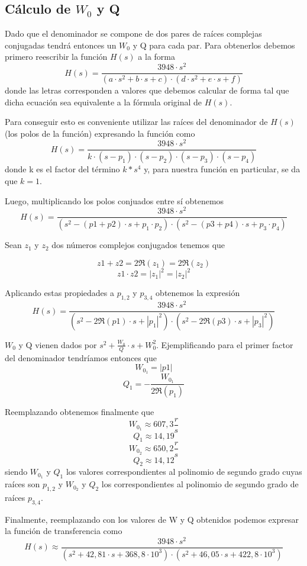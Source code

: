 \documentclass[11pt,a4paper]{report}
\begin{document}
\subsection*{Cálculo de $W_{0}$ y Q}

Dado que el denominador se compone de dos pares de raíces complejas conjugadas tendrá entonces un $W_{0}$ y Q para cada par. Para obtenerlos debemos primero reescribir la función $H(s)$ a la forma
\[H(s)=\frac{3948 \cdot s^2}{(a \cdot s^2+b \cdot s+c) \cdot (d \cdot s^2+e \cdot s+f)}\]
donde las letras corresponden a valores que debemos calcular de forma tal que dicha
ecuación sea equivalente a la fórmula original de $H(s)$.

\bigskip
Para conseguir esto es conveniente utilizar las raíces del denominador de $H(s)$ (los polos de la función) expresando la función como
\[H(s)=\frac{3948 \cdot s^2}{k \cdot (s-p_{1}) \cdot (s-p_{2}) \cdot (s-p_{3}) \cdot (s-p_{4})}\]
donde k es el factor del término $k*s^4$ y, para nuestra función en particular,
se da que $k=1$. 

\bigskip
Luego, multiplicando los polos conjuados entre sí obtenemos
\[H(s)=\frac{3948 \cdot s^2}{(s^2-(p1+p2) \cdot s+p_{1} \cdot p_{2}) \cdot (s^2-(p3+p4) \cdot s+p_{3} \cdot p_{4})}\]

\bigskip
Sean $z_{1}$ y $z_{2}$ dos números complejos conjugados tenemos que 

\[z1+z2=2\Re(z_{1}) = 2\Re(z_{2})\] 
\[z1 \cdot z2=|z_{1}|^2=|z_{2}|^2\] 

Aplicando estas propiedades a $p_{1,2}$ y 
$p_{3,4}$ obtenemos la expresión
\[H(s)=\frac{3948 \cdot s^2}{(s^2-2\Re(p1) \cdot s+|p_{1}|^2) \cdot (s^2-2\Re(p3) \cdot s+|p_{3}|^2)}\]

\bigskip
$W_{0}$ y Q vienen dados por $s^2+\frac{W_{0}}{Q} \cdot s + W_{0}^2$. Ejemplificando para el primer factor del denominador tendríamos entonces que 
\[W_{0_{1}} = |p1|\]
\[Q_{1} = -\frac{W_{0_{1}}}{2\Re(p_{1})}\]

\bigskip
Reemplazando obtenemos finalmente que
\[W_{0_{1}} \approx 607,3 \frac{r}{s}\]
\[Q_{1} \approx 14,19\]
\[W_{0_{2}} \approx 650,2 \frac{r}{s}\]
\[Q_{2} \approx 14,12\]
siendo $W_{0_{1}}$ y $Q_{1}$ los valores correspondientes al polinomio de segundo 
grado cuyas raíces son $p_{1,2}$ y $W_{0_{2}}$ y $Q_{2}$ los correspondientes
al polinomio de segundo grado de raíces $p_{3,4}$.

\bigskip
Finalmente, reemplazando con los valores de W y Q obtenidos podemos expresar la función de transferencia como
\[H(s) \approx \frac{3948 \cdot s^2}{(s^2+42,81 \cdot s +368,8 \cdot 10^3)
\cdot (s^2+46,05 \cdot s + 422,8 \cdot 10^3)}\]
\end{document}
